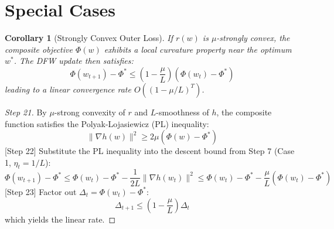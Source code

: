 \documentclass{article}
\newtheorem{corollary}{Corollary}
\begin{document}
\section*{Special Cases}
\begin{corollary}[Strongly Convex Outer Loss]
If $r(w)$ is $\mu$-strongly convex, the composite objective $\Phi(w)$ exhibits a local curvature property near the optimum $w^*$. The DFW update then satisfies:
\begin{equation}
    \Phi(w_{t+1}) - \Phi^* \leq (1 - \frac{\mu}{L}) (\Phi(w_t) - \Phi^*)
\end{equation}
leading to a linear convergence rate $O\left((1 - \mu/L)^T\right)$.
\end{corollary}
\begin{proof}
[Step 21] By $\mu$-strong convexity of $r$ and $L$-smoothness of $h$, the composite function satisfies the Polyak-Lojasiewicz (PL) inequality:
\begin{equation}
    \|\nabla h(w)\|^2 \geq 2\mu (\Phi(w) - \Phi^*)
\end{equation}
[Step 22] Substitute the PL inequality into the descent bound from Step 7 (Case 1, $\eta_t = 1/L$):
\begin{equation}
    \Phi(w_{t+1}) - \Phi^* \leq \Phi(w_t) - \Phi^* - \frac{1}{2L} \|\nabla h(w_t)\|^2 \leq \Phi(w_t) - \Phi^* - \frac{\mu}{L} (\Phi(w_t) - \Phi^*)
\end{equation}
[Step 23] Factor out $\Delta_t = \Phi(w_t) - \Phi^*$:
\begin{equation}
    \Delta_{t+1} \leq \left(1 - \frac{\mu}{L}\right) \Delta_t
\end{equation}
which yields the linear rate.
\end{proof}
\end{document}
